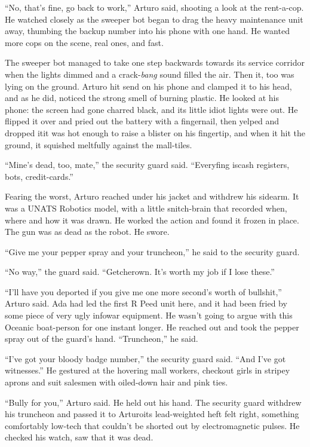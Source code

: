 “No, that’s fine, go back to work,” Arturo said, shooting a look at
the rent-a-cop. He watched closely as the sweeper bot began to drag
the heavy maintenance unit away, thumbing the backup number into
his phone with one hand. He wanted more cops on the scene, real
ones, and fast.

The sweeper bot managed to take one step backwards towards its
service corridor when the lights dimmed and a crack-\emph{bang}
sound filled the air. Then it, too was lying on the ground. Arturo
hit send on his phone and clamped it to his head, and as he did,
noticed the strong smell of burning plastic. He looked at his
phone: the screen had gone charred black, and its little idiot
lights were out. He flipped it over and pried out the battery with
a fingernail, then yelped and dropped it{\dash}it was hot enough to raise
a blister on his fingertip, and when it hit the ground, it squished
meltfully against the mall-tiles.

“Mine’s dead, too, mate,” the security guard said. “Everyfing
is{\dash}cash registers, bots, credit-cards.”

Fearing the worst, Arturo reached under his jacket and withdrew his
sidearm. It was a UNATS Robotics model, with a little snitch-brain
that recorded when, where and how it was drawn. He worked the
action and found it frozen in place. The gun was as dead as the
robot. He swore.

“Give me your pepper spray and your truncheon,” he said to the
security guard.

“No way,” the guard said. “Getcherown. It’s worth my job if I lose
these.”

“I’ll have you deported if you give me one more second’s worth of
bullshit,” Arturo said. Ada had led the first R Peed unit here, and
it had been fried by some piece of very ugly infowar equipment. He
wasn’t going to argue with this Oceanic boat-person for one instant
longer. He reached out and took the pepper spray out of the guard’s
hand. “Truncheon,” he said.

“I’ve got your bloody badge number,” the security guard said. “And
I’ve got witnesses.” He gestured at the hovering mall workers,
checkout girls in stripey aprons and suit salesmen with oiled-down
hair and pink ties.

“Bully for you,” Arturo said. He held out his hand. The security
guard withdrew his truncheon and passed it to Arturo{\dash}its
lead-weighted heft felt right, something comfortably low-tech that
couldn’t be shorted out by electromagnetic pulses. He checked his
watch, saw that it was dead.

